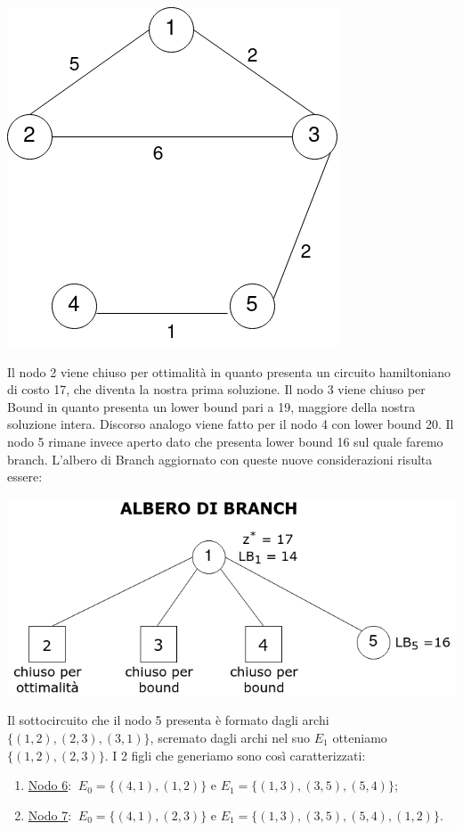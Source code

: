 \documentclass[
	article,			%
	12pt,				%
	oneside,			%
	a4paper,			%
	english,			%
	italian,				%
	sumario=tradicional,
	]{abntex2}
\begin{document}
\begin{center}
    \qquad
    \includegraphics[scale=0.26]{files/quinto1Tree.png}
\end{center}
Il nodo 2 viene chiuso per ottimalità in quanto presenta un circuito hamiltoniano di costo 17, che diventa la nostra prima soluzione. Il nodo 3 viene chiuso per Bound in quanto presenta un lower bound pari a 19, maggiore della nostra soluzione intera. Discorso analogo viene fatto per il nodo 4 con lower bound 20. Il nodo 5 rimane invece aperto dato che presenta lower bound 16 sul quale faremo branch.
\newline
L'albero di Branch aggiornato con queste nuove considerazioni risulta essere:
\begin{center}
    \includegraphics[scale=0.4]{files/alberoBranch2.png}
\end{center}
Il sottocircuito che il nodo 5 presenta è formato dagli archi $\{(1,2),(2,3),(3,1)\}$, scremato dagli archi nel suo $E_1$ otteniamo $\{(1,2),(2,3)\}$. I 2 figli che generiamo sono così caratterizzati:
\begin{enumerate}
    \item [] \underline{Nodo 6}: $\:E_0 = \{(4,1),(1,2)\}$ e $E_1 = \{(1,3),(3,5),(5,4)\}$;
    \item [] \underline{Nodo 7}: $\:E_0 = \{(4,1),(2,3)\}$ e $E_1 = \{(1,3),(3,5),(5,4), (1,2)\}$.
\end{enumerate}
\end{document}
